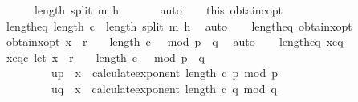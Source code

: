 \begin{isabellebody}
\ \ \ \ \ {\isacharequal}{\kern0pt}\ length\ {\isacharparenleft}{\kern0pt}split\ m\ h{\isacharparenright}{\kern0pt}{\isachardoublequoteclose}\ \isanewline
\ \ \ \ \isamarkupfalse%
\ auto\isanewline
\ \ \isamarkupfalse%
\ this\ obtain{\isacharunderscore}{\kern0pt}c{\isacharunderscore}{\kern0pt}opt{}\ \isamarkupfalse%
\ length{\isacharunderscore}{\kern0pt}eq{\isacharcolon}{\kern0pt}\ {\isachardoublequoteopen}length\ c\ {\isacharequal}{\kern0pt}\ length\ {\isacharparenleft}{\kern0pt}split\ m\ h{\isacharparenright}{\kern0pt}{\isachardoublequoteclose}\ \isamarkupfalse%
\ auto\isanewline
\ \ \isamarkupfalse%
\ length{\isacharunderscore}{\kern0pt}eq\ obtain{\isacharunderscore}{\kern0pt}x{\isacharunderscore}{\kern0pt}opt{}\ \isamarkupfalse%
\ obtain{\isacharunderscore}{\kern0pt}x{\isacharunderscore}{\kern0pt}opt{}{\isacharcolon}{\kern0pt}\ {\isachardoublequoteopen}x\ {\isacharequal}{\kern0pt}\ r\ {\isacharcircum}{\kern0pt}\ {}\ {\isacharcircum}{\kern0pt}\ {\isacharparenleft}{\kern0pt}length\ c\ {\isacharplus}{\kern0pt}\ {}{\isacharparenright}{\kern0pt}\ mod\ {\isacharparenleft}{\kern0pt}p\ {\isacharasterisk}{\kern0pt}\ q{\isacharparenright}{\kern0pt}{\isachardoublequoteclose}\ \isamarkupfalse%
\ auto\isanewline
\isanewline
\isanewline
\ \ \isamarkupfalse%
\ length{\isacharunderscore}{\kern0pt}eq\ x{\isacharunderscore}{\kern0pt}{}{\isacharunderscore}{\kern0pt}eq\ \isamarkupfalse%
\ x{\isacharunderscore}{\kern0pt}{}{\isacharunderscore}{\kern0pt}eqc{\isacharcolon}{\kern0pt}\ {\isachardoublequoteopen}{\isacharparenleft}{\kern0pt}let\ x\ {\isacharequal}{\kern0pt}\ r\ {\isacharcircum}{\kern0pt}\ {}\ {\isacharcircum}{\kern0pt}\ {\isacharparenleft}{\kern0pt}length\ c\ {\isacharplus}{\kern0pt}\ {}{\isacharparenright}{\kern0pt}\ mod\ {\isacharparenleft}{\kern0pt}p\ {\isacharasterisk}{\kern0pt}\ q{\isacharparenright}{\kern0pt}{\isacharsemicolon}{\kern0pt}\isanewline
\ \ \ \ \ \ \ \ \ u{\isacharunderscore}{\kern0pt}p\ {\isacharequal}{\kern0pt}\ x\ {\isacharcircum}{\kern0pt}\ calculate{\isacharunderscore}{\kern0pt}exponent\ {\isacharparenleft}{\kern0pt}length\ c{\isacharparenright}{\kern0pt}\ p\ mod\ p{\isacharsemicolon}{\kern0pt}\isanewline
\ \ \ \ \ \ \ \ \ u{\isacharunderscore}{\kern0pt}q\ {\isacharequal}{\kern0pt}\ x\ {\isacharcircum}{\kern0pt}\ calculate{\isacharunderscore}{\kern0pt}exponent\ {\isacharparenleft}{\kern0pt}length\ c{\isacharparenright}{\kern0pt}\ q\ mod\ q{\isacharsemicolon}{\kern0pt}\isanewline

\end{isabellebody}
